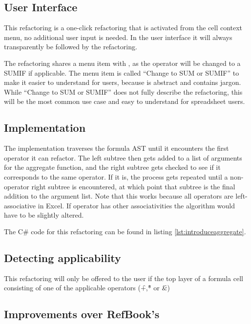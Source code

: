 \subsection{User Interface}

This refactoring is a one-click refactoring that is activated from the cell context menu, no additional user input is needed.
In the user interface it will always transparently be followed by the  refactoring.

The refactoring shares a menu item with , as the operator will be changed to a SUMIF if applicable.
The menu item is called ``Change to SUM or SUMIF'' to make it easier to understand for users, because  is abstract and contains jargon.
While ``Change to SUM or SUMIF'' does not fully describe the refactoring, this will be the most common use case and easy to understand for spreadsheet users.

\subsection{Implementation}

The implementation traverses the formula AST until it encounters the first operator it can refactor.
The left subtree then gets added to a list of arguments for the aggregate function, and the right subtree gets checked to see if it corresponds to the same operator.
If it is, the process gets repeated until a non-operator right subtree is encountered, at which point that subtree is the final addition to the argument list.
Note that this works because all operators are left-associative in Excel.
If operator has other associativities the algorithm would have to be slightly altered.

The C\# code for this refactoring can be found in listing \ref{lst:introduceaggregate}.

\subsection{Detecting applicability}

This refactoring will only be offered to the user if the top layer of a formula cell consisting of one of the applicable operators (\f{+},\f{*} or \f{\&})

\subsection{Improvements over RefBook's }

